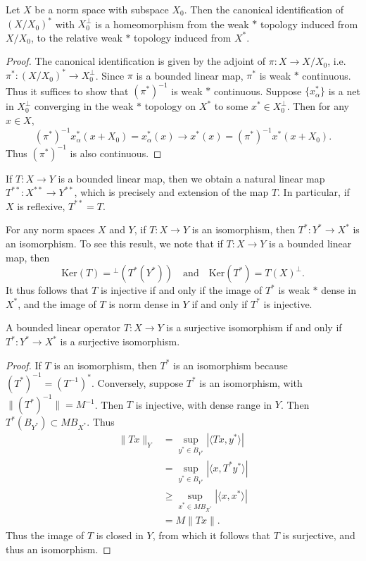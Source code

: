 \begin{corollary}
    Let $X$ be a norm space with subspace $X_0$. Then the canonical identification of $(X/X_0)^*$ with $X_0^\perp$ is a homeomorphism from the weak $*$ topology induced from $X/X_0$, to the relative weak $*$ topology induced from $X^*$.
\end{corollary}
\begin{proof}
    The canonical identification is given by the adjoint of $\pi: X \to X/X_0$, i.e. $\pi^*: (X/X_0)^* \to X_0^\perp$. Since $\pi$ is a bounded linear map, $\pi^*$ is weak $*$ continuous. Thus it suffices to show that $(\pi^*)^{-1}$ is weak $*$ continuous. Suppose $\{ x_\alpha^* \}$ is a net in $X_0^\perp$ converging in the weak $*$ topology on $X^*$ to some $x^* \in X_0^\perp$. Then for any $x \in X$,
    \[ (\pi^*)^{-1} x_\alpha^*(x + X_0) = x_\alpha^*(x) \to x^*(x) = (\pi^*)^{-1} x^* (x + X_0). \]
    Thus $(\pi^*)^{-1}$ is also continuous.
\end{proof}

If $T: X \to Y$ is a bounded linear map, then we obtain a natural linear map $T^{**}: X^{**} \to Y^{**}$, which is precisely and extension of the map $T$. In particular, if $X$ is reflexive, $T^{**} = T$.

For any norm spaces $X$ and $Y$, if $T: X \to Y$ is an isomorphism, then $T^*: Y^* \to X^*$ is an isomorphism. To see this result, we note that if $T: X \to Y$ is a bounded linear map, then
%
\[ \text{Ker}(T) = {}^\perp (T^*(Y^*)) \quad\text{and}\quad \text{Ker}(T^*) = T(X)^\perp. \]
%
It thus follows that $T$ is injective if and only if the image of $T^*$ is weak $*$ dense in $X^*$, and the image of $T$ is norm dense in $Y$ if and only if $T^*$ is injective.

\begin{theorem}
    A bounded linear operator $T: X \to Y$ is a surjective isomorphism if and only if $T^*: Y^* \to X^*$ is a surjective isomorphism.
\end{theorem}
\begin{proof}
    If $T$ is an isomorphism, then $T^*$ is an isomorphism because $(T^*)^{-1} = (T^{-1})^*$. Conversely, suppose $T^*$ is an isomorphism, with $\| (T^*)^{-1} \| = M^{-1}$. Then $T$ is injective, with dense range in $Y$. Then $T^*(B_{Y^*}) \subset M B_{X^*}$. Thus
    \begin{align*}
        \| Tx \|_Y &= \sup_{y^* \in B_{Y^*}} |\langle Tx, y^* \rangle|\\
        &= \sup_{y^* \in B_{Y^*}} |\langle x, T^* y^* \rangle|\\
        &\geq \sup_{x^* \in M B_{X^*}} |\langle x, x^* \rangle|\\
        &= M \| Tx \|.
    \end{align*}
    Thus the image of $T$ is closed in $Y$, from which it follows that $T$ is surjective, and thus an isomorphism.
\end{proof}

